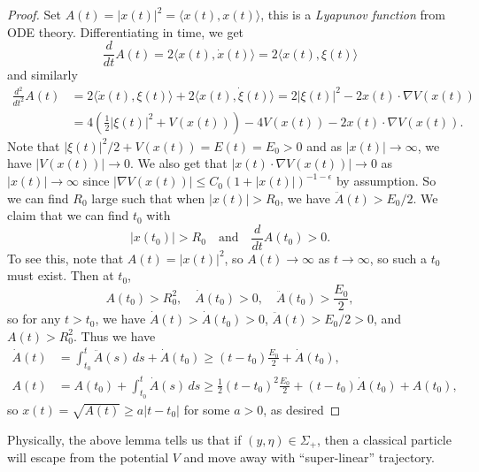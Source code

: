 \begin{proof}
  Set $A(t) = |x(t)|^2 = \langle x(t), x(t) \rangle$, this is a
  \emph{Lyapunov function} from ODE theory.
  Differentiating in time, we get
  \[
    \frac{d}{dt} A(t)
    = 2 \langle x(t), \dot{x}(t) \rangle
    = 2 \langle x(t), \xi(t) \rangle
  \]
  and similarly
  \begin{align*}
    \frac{d^2}{dt^2} A(t)
    &= 2 \langle \dot{x}(t), \xi(t) \rangle
    + 2 \langle x(t), \dot{\xi}(t) \rangle
    = 2 |\xi(t)|^2 - 2 x(t) \cdot \nabla V(x(t)) \\
    &= 4 \left(\frac{1}{2} |\xi(t)|^2 + V(x(t))\right)
    - 4V(x(t)) - 2x(t) \cdot \nabla V(x(t)).
  \end{align*}
  Note that $|\xi(t)|^2 / 2 + V(x(t)) = E(t) = E_0 > 0$
  and as $|x(t)| \to \infty$, we have
  $|V(x(t))| \to 0$. We also get that
  $|x(t) \cdot \nabla V(x(t))| \to 0$
  as $|x(t)| \to \infty$
  since $|\nabla V(x(t))| \le C_0 (1 + |x(t)|)^{-1 - \epsilon}$
  by assumption. So we can find $R_0$
  large such that when $|x(t)| > R_0$,
  we have $\ddot{A}(t) > E_0 / 2$. We claim that we
  can find $t_0$ with
  \[
    |x(t_0)| > R_0 \quad \text{and} \quad
    \frac{d}{dt} A(t_0) > 0.
  \]
  To see this, note that $A(t) = |x(t)|^2$, so
  $A(t) \to \infty$ as $t \to \infty$, so
  such a $t_0$ must exist. Then at $t_0$,
  \[
    A(t_0) > R_0^2, \quad \dot{A}(t_0) > 0, \quad
    \ddot{A}(t_0) > \frac{E_0}{2},
  \]
  so for any $t > t_0$, we have
  $\dot{A}(t) > \dot{A}(t_0) > 0$,
  $\ddot{A}(t) > E_0 / 2 > 0$, and $A(t) > R_0^2$. Thus
  we have
  \begin{align*}
    \dot{A}(t)
    &= \int_{t_0}^t \ddot{A}(s)\, ds + \dot{A}(t_0)
    \ge (t - t_0) \frac{E_0}{2} + \dot{A}(t_0), \\
    A(t)
    & = A(t_0) + \int_{t_0}^t \dot{A}(s)\, ds
    \ge \frac{1}{2} (t - t_0)^2 \frac{E_0}{2}
    + (t - t_0) \dot{A}(t_0) + A(t_0),
  \end{align*}
  so $x(t) = \sqrt{A(t)} \ge a|t - t_0|$
  for some $a > 0$, as desired
\end{proof}

\begin{remark}
  Physically, the above lemma tells us that
  if $(y, \eta) \in \Sigma_+$, then a classical
  particle will escape from the potential $V$
  and move away with ``super-linear''
  trajectory.
\end{remark}

